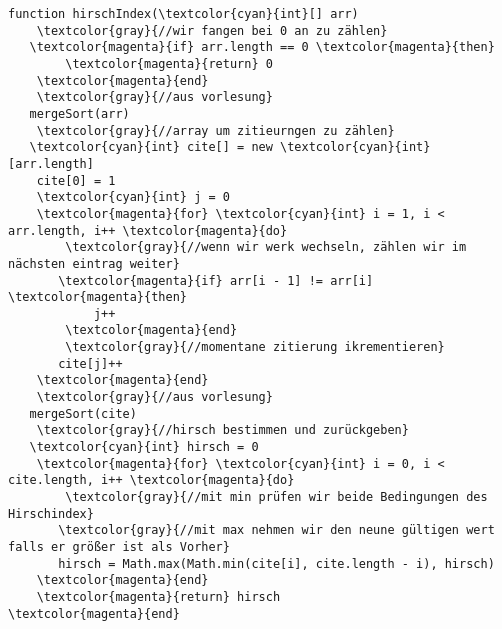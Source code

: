 \begin{Verbatim}[commandchars=\\\{\}]
function hirschIndex(\textcolor{cyan}{int}[] arr) 
    \textcolor{gray}{//wir fangen bei 0 an zu zählen}
   \textcolor{magenta}{if} arr.length == 0 \textcolor{magenta}{then}
        \textcolor{magenta}{return} 0
    \textcolor{magenta}{end}
    \textcolor{gray}{//aus vorlesung}
   mergeSort(arr)
    \textcolor{gray}{//array um zitieurngen zu zählen}
   \textcolor{cyan}{int} cite[] = new \textcolor{cyan}{int}[arr.length]
    cite[0] = 1
    \textcolor{cyan}{int} j = 0
    \textcolor{magenta}{for} \textcolor{cyan}{int} i = 1, i < arr.length, i++ \textcolor{magenta}{do}
        \textcolor{gray}{//wenn wir werk wechseln, zählen wir im nächsten eintrag weiter}
       \textcolor{magenta}{if} arr[i - 1] != arr[i] \textcolor{magenta}{then}
            j++
        \textcolor{magenta}{end}
        \textcolor{gray}{//momentane zitierung ikrementieren}
       cite[j]++
    \textcolor{magenta}{end}
    \textcolor{gray}{//aus vorlesung}
   mergeSort(cite)
    \textcolor{gray}{//hirsch bestimmen und zurückgeben}
   \textcolor{cyan}{int} hirsch = 0
    \textcolor{magenta}{for} \textcolor{cyan}{int} i = 0, i < cite.length, i++ \textcolor{magenta}{do}
        \textcolor{gray}{//mit min prüfen wir beide Bedingungen des Hirschindex}
       \textcolor{gray}{//mit max nehmen wir den neune gültigen wert falls er größer ist als Vorher}
       hirsch = Math.max(Math.min(cite[i], cite.length - i), hirsch)
    \textcolor{magenta}{end}
    \textcolor{magenta}{return} hirsch
\textcolor{magenta}{end}
\end{Verbatim}

